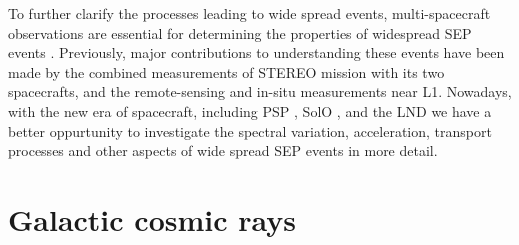 To further clarify the processes leading to wide spread events, multi-spacecraft observations are essential for determining the properties of widespread \ac{SEP} events \citep{Kolhoff2021AA}. Previously, major contributions to understanding these events have been made by the combined measurements of \ac{STEREO} mission with its two spacecrafts, and the remote-sensing and in-situ measurements near \ac{L1}. Nowadays, with the new era of spacecraft, including \acl{PSP} \citep{Fox2016SSRv}, \acl{SolO}  \citep{Mueller-2020-SolO}, and the \acl{LND} \citep{Wimmer2020SSRv} we have a better oppurtunity to investigate the spectral variation, acceleration, transport processes and other aspects of wide spread \ac{SEP} events in more detail.





\section{Galactic cosmic rays}

